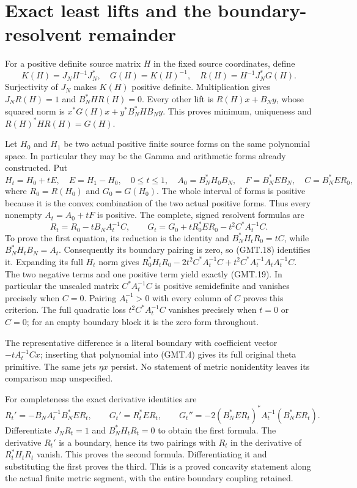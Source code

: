 \documentclass[11pt]{article}
\begin{document}
\section{Exact least lifts and the boundary-resolvent remainder}

For a positive definite source matrix $H$ in the fixed source coordinates,
define
\[
 K(H)=J_NH^{-1}J_N^*,\quad G(H)=K(H)^{-1},\quad
 R(H)=H^{-1}J_N^*G(H).                                         \tag{GMT.18}
\]
Surjectivity of $J_N$ makes $K(H)$ positive definite.
Multiplication gives $J_NR(H)=1$ and $B_N^*HR(H)=0$.
Every other lift is $R(H)x+B_Ny$, whose squared norm is
$x^*G(H)x+y^*B_N^*HB_Ny$. This proves minimum, uniqueness and
$R(H)^*HR(H)=G(H)$.

Let $H_0$ and $H_1$ be two actual positive finite source forms on
the same polynomial space. In particular they may be the Gamma and
arithmetic forms already constructed. Put
\[
 H_t=H_0+tE,\quad E=H_1-H_0,\quad0\le t\le1,\quad
 A_0=B_N^*H_0B_N,\quad F=B_N^*EB_N,\quad C=B_N^*ER_0,
\]
where $R_0=R(H_0)$ and $G_0=G(H_0)$. The whole interval of forms
is positive because it is the convex combination of the two actual
positive forms. Thus every nonempty $A_t=A_0+tF$ is positive.
The complete, signed resolvent formulas are
\[
 \boxed{R_t=R_0-tB_NA_t^{-1}C,\qquad
 G_t=G_0+tR_0^*ER_0-t^2C^*A_t^{-1}C.}                         \tag{GMT.19}
\]
To prove the first equation, its reduction is the identity and
$B_N^*H_tR_0=tC$, while $B_N^*H_tB_N=A_t$.
Consequently its boundary pairing is zero, so (GMT.18) identifies it.
Expanding its full $H_t$ norm gives
$R_0^*H_tR_0-2t^2C^*A_t^{-1}C+t^2C^*A_t^{-1}A_tA_t^{-1}C$.
The two negative terms and one positive term yield exactly (GMT.19).
In particular the unscaled matrix $C^*A_t^{-1}C$ is positive
semidefinite and vanishes precisely when $C=0$. Pairing $A_t^{-1}>0$
with every column of $C$ proves this criterion. The full quadratic
loss $t^2C^*A_t^{-1}C$ vanishes precisely when $t=0$ or $C=0$;
for an empty boundary block it is the zero form throughout.

The representative difference is a literal boundary with coefficient
vector $-tA_t^{-1}Cx$; inserting that polynomial into (GMT.4) gives
its full original theta primitive. The same jets $\eta x$ persist.
No statement of metric nonidentity leaves its comparison map unspecified.

For completeness the exact derivative identities are
\[
 R_t'=-B_NA_t^{-1}B_N^*ER_t,\qquad
 G_t'=R_t^*ER_t,\qquad
 G_t''=-2(B_N^*ER_t)^*A_t^{-1}(B_N^*ER_t).                     \tag{GMT.20}
\]
Differentiate $J_NR_t=1$ and $B_N^*H_tR_t=0$ to obtain the first
formula. The derivative $R_t'$ is a boundary, hence its two pairings
with $R_t$ in the derivative of $R_t^*H_tR_t$ vanish. This proves
the second formula. Differentiating it and substituting the first
proves the third. This is a proved concavity statement along the
actual finite metric segment, with the entire boundary coupling retained.
\end{document}
